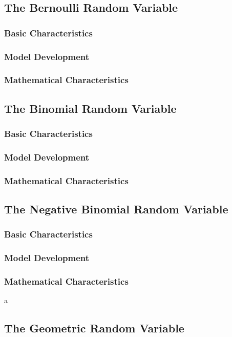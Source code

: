 \documentclass[twoside]{article}
\theoremstyle{definition}
\theoremstyle{remark}
\theoremstyle{remark}
\begin{document}
\subsection{The Bernoulli Random Variable}
\subsubsection{Basic Characteristics}
\subsubsection{Model Development}
\subsubsection{Mathematical Characteristics}

\subsection{The Binomial Random Variable}
\subsubsection{Basic Characteristics}
\subsubsection{Model Development}
\subsubsection{Mathematical Characteristics}

\subsection{The Negative Binomial Random Variable}
\subsubsection{Basic Characteristics}
\subsubsection{Model Development}
\subsubsection{Mathematical Characteristics}
a
\subsection{The Geometric Random Variable}
\end{document}
